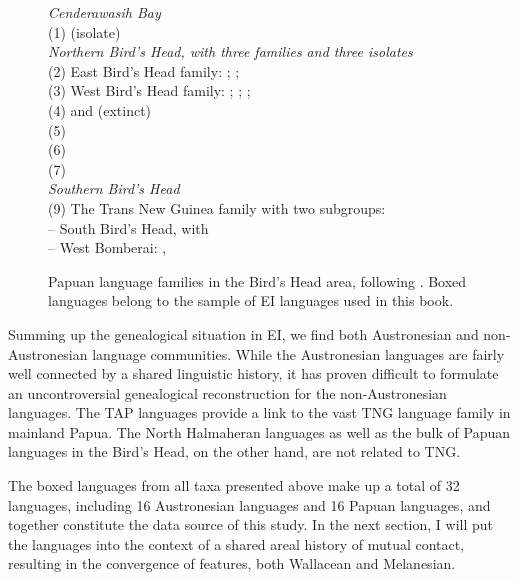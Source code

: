 \begin{figure}[ht]
{\raggedright%
\begin{footnotesize}
\textit{Cenderawasih Bay} \\
(1)  (isolate) \bigskip\\
\textit{Northern Bird’s Head, with three families and three isolates} \\
(2) East Bird’s Head family: ; ;  \\
(3) West Bird’s Head family: ; ; ;  \\
(4)  and (extinct)  \\
(5)  \\
(6)  \\
(7)  \bigskip\\
\textit{Southern Bird’s Head} \\
(9) The Trans New Guinea family with two subgroups: \\
– South Bird’s Head, with  \\
– West Bomberai: ,  \\
\end{footnotesize}}
\caption[The Papuan languages of the Bird's Head]{Papuan language families in the Bird's Head area, following \citet{klamer2008east}. Boxed languages belong to the sample of EI languages used in this book.}
\end{figure}

Summing up the genealogical situation in EI, we find both Austronesian and non-Austronesian language communities. While the Austronesian languages are fairly well connected by a shared linguistic history, it has proven difficult to formulate an uncontroversial genealogical reconstruction for the non-Austronesian languages. The TAP languages provide a link to the vast TNG language family in mainland Papua. The North Halmaheran languages as well as the bulk of Papuan languages in the Bird's Head, on the other hand, are not related to TNG. 

The boxed languages from all taxa presented above make up a total of 32 languages, including 16 Austronesian languages and 16 Papuan languages, and together constitute the data source of this study. In the next section, I will put the languages into the context of a shared areal history of mutual contact, resulting in the convergence of features, both Wallacean and Melanesian.


